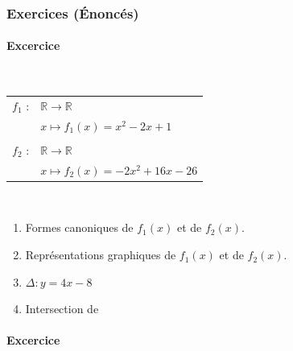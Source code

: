\samepage

\newpage

\subsubsection{Exercices (Énoncés)}

\paragraph{Excercice }~\\

\begin{tabular}{r@{$\;$ }l}
  $f_1$ : & $ \mathbb{R} \longrightarrow \mathbb{R}$  \\
        & $ x \longmapsto f_1(x) = x^2 -2x + 1$       \\
        &                                             \\ 
  $f_2$ : & $ \mathbb{R} \longrightarrow \mathbb{R}$  \\
        & $ x \longmapsto f_2(x) = -2x^2 +16x  -26$   \\
\end{tabular}\\


\begin{enumerate} 
\renewcommand{\theenumi}{\alph{enumi})}

\item Formes canoniques de $f_1(x)$ et de $f_2(x)$.

\item Représentations graphiques de $f_1(x)$ et de $f_2(x)$.

\item $\Delta : y = 4x - 8$

\item Intersection de \\

\end{enumerate}


\paragraph{Excercice }~\\

